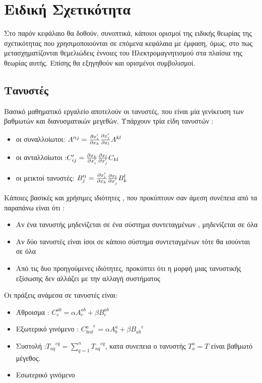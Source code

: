 \section{Ειδική Σχετικότητα}

Στο παρόν κεφάλαιο θα δοθούν, συνοπτικά, κάποιοι ορισμοί της ειδικής θεωρίας της σχετικότητας που χρησιμοποιούνται σε επόμενα κεφάλαια με έμφαση, όμως, στο  πως μετασχηματίζονται θεμελιώδεις έννοιες του Ηλεκτρομαγνητισμού στα πλαίσια της θεωρίας αυτής. Επίσης θα εξηγηθούν και ορισμένοι συμβολισμοί. 

\subsection{Τανυστές}


Βασικό μαθηματικό εργαλείο αποτελούν οι τανυστές, που είναι μία γενίκευση των βαθμωτών και διανυσματικών μεγεθών. Υπάρχουν τρία είδη τανυστών :

\begin{itemize}
\item οι συναλλοίωτοι: $ A'^{ij} = \frac{\partial x'_i }{\partial x_k} \frac{\partial x'_j}{\partial x_l} A^{kl} $
\item οι ανταλλοίωτοι :$ C'_{ij} = \frac{\partial x_k}{\partial x'_i} \frac{\partial x_l}{\partial x'_j}C_{kl}$ 
\item οι μεικτοί τανυστές: $ B'^i_j  =\frac{\partial x'_i }{\partial x_k} \frac{\partial x_l}{\partial x'_j} B^l_k  $
\end{itemize}

\flushleft 
Κάποιες βασικές και χρήσιμες ιδιότητες , που προκύπτουν σαν άμεση συνέπεια από τα παραπάνω είναι ότι :

\begin{itemize}
\item Αν ένα τανυστής μηδενίζεται σε ένα σύστημα συντεταγμένων , μηδενίζεται σε όλα 
\item Αν δύο τανυστές είναι ίσοι σε κάποιο σύστημα συντεταγμένων τότε θα ισούνται σε όλα 
\item Από τις δυο προηγούμενες ιδιότητες, προκύπτει ότι η μορφή μιας τανυστικής εξίσωσης δεν αλλάζει με την αλλαγή συστήματος 
\end{itemize}
	
Οι πράξεις ανάμεσα σε τανυστές είναι: 

\begin{itemize}
\item Άθροισμα : $C^{ab}_c = \alpha A^{ab}_c +\beta B^{ab}_c $ 
\item Εξωτερικό γινόμενο : ${C^{a}_{bcd}}^e = \alpha A^{a}_b +\beta {B_{ab}}^{e} $ 
\item Συστολή :$ {T_{aq}}^{cq} = \sum\limits_{q=1}^n {T_{aq}}^{cq} $, κατα συνεπεια ο τανυστής $ T^a_a = T $ είναι βαθμωτό μέγεθος.  \
\item Εσωτερικό γινόμενο 
\end{itemize}

